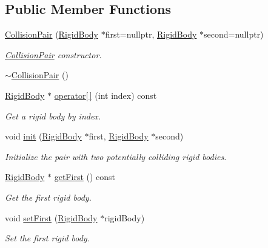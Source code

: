 \subsection*{Public Member Functions}
\begin{DoxyCompactItemize}
\item 
\mbox{\hyperlink{classr3_1_1_collision_pair_ab6434bde3aa02c2655e26a976570db01}{Collision\+Pair}} (\mbox{\hyperlink{classr3_1_1_rigid_body}{Rigid\+Body}} $\ast$first=nullptr, \mbox{\hyperlink{classr3_1_1_rigid_body}{Rigid\+Body}} $\ast$second=nullptr)
\begin{DoxyCompactList}\small\item\em \mbox{\hyperlink{classr3_1_1_collision_pair}{Collision\+Pair}} constructor. \end{DoxyCompactList}\item 
\mbox{\hyperlink{classr3_1_1_collision_pair_a38ae2cf6732b5a1b4dfdc544bbff82e0}{$\sim$\+Collision\+Pair}} ()
\item 
\mbox{\hyperlink{classr3_1_1_rigid_body}{Rigid\+Body}} $\ast$ \mbox{\hyperlink{classr3_1_1_collision_pair_a8d56c936cb56821247c5b1a684578c0a}{operator\mbox{[}$\,$\mbox{]}}} (int index) const
\begin{DoxyCompactList}\small\item\em Get a rigid body by index. \end{DoxyCompactList}\item 
void \mbox{\hyperlink{classr3_1_1_collision_pair_a7e64e731162cfdc3222d8f02b7c886b1}{init}} (\mbox{\hyperlink{classr3_1_1_rigid_body}{Rigid\+Body}} $\ast$first, \mbox{\hyperlink{classr3_1_1_rigid_body}{Rigid\+Body}} $\ast$second)
\begin{DoxyCompactList}\small\item\em Initialize the pair with two potentially colliding rigid bodies. \end{DoxyCompactList}\item 
\mbox{\hyperlink{classr3_1_1_rigid_body}{Rigid\+Body}} $\ast$ \mbox{\hyperlink{classr3_1_1_collision_pair_a603f9437f7fa4aa5253ad26247ee75ae}{get\+First}} () const
\begin{DoxyCompactList}\small\item\em Get the first rigid body. \end{DoxyCompactList}\item 
void \mbox{\hyperlink{classr3_1_1_collision_pair_aed434b37e17c828ac66b69d0f5655fab}{set\+First}} (\mbox{\hyperlink{classr3_1_1_rigid_body}{Rigid\+Body}} $\ast$rigid\+Body)
\begin{DoxyCompactList}\small\item\em Set the first rigid body. \end{DoxyCompactList}\item 

\end{DoxyCompactItemize}
